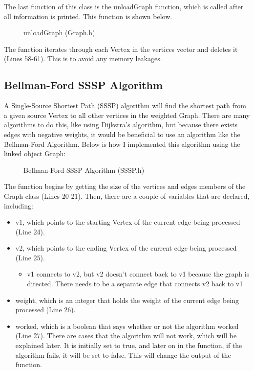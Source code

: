 \documentclass[letterpaper, 10pt]{article}
\begin{document}
\vspace{1em}
\noindent
The last function of this class is the unloadGraph function, which is called after all information is printed. This function is shown below.

\begin{figure}[H]
  \centering
   
  \caption{unloadGraph (Graph.h)}
  \label{fig:figure2.9}
\end{figure}

\noindent
The function iterates through each Vertex in the vertices vector and deletes it (Lines 58-61). This is to avoid any memory leakages.

\vspace{5em}

\subsection{Bellman-Ford SSSP Algorithm}
\vspace{-0.5em}
\noindent
A Single-Source Shortest Path (SSSP) algorithm will find the shortest path from a given source Vertex to all other vertices in the weighted Graph. There are many algorithms to do this, like using Dijkstra's algorithm, but because there exists edges with negative weights, it would be beneficial to use an algorithm like the Bellman-Ford Algorithm. Below is how I implemented this algorithm using the linked object Graph: 

\vspace{-1em}
\begin{figure}[H]
  \centering
   
  \caption{Bellman-Ford SSSP Algorithm (SSSP.h)}
  \label{fig:figure2.10}
\end{figure}

\noindent
The function begins by getting the size of the vertices and edges members of the Graph class (Lines 20-21). Then, there are a couple of variables that are declared, including:
\begin{itemize}
    \item v1, which points to the starting Vertex of the current edge being processed (Line 24).
    \item v2, which points to the ending Vertex of the current edge being processed (Line 25).
    \begin{itemize}
        \item v1 connects to v2, but v2 doesn't connect back to v1 because the graph is directed. There needs to be a separate edge that connects v2 back to v1
    \end{itemize}
    \item weight, which is an integer that holds the weight of the current edge being processed (Line 26).
    \item worked, which is a boolean that says whether or not the algorithm worked (Line 27). There are cases that the algorithm will not work, which will be explained later. It is initially set to true, and later on in the function, if the algorithm fails, it will be set to false. This will change the output of the function. 
\end{itemize}
\end{document}
